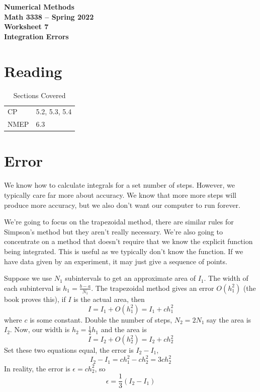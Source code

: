 \documentclass[11pt,letterpaper]{article}
\newcommand{\semester}{Spring 2022}
\begin{document}
\begin{center}
{\huge{\bf  Numerical Methods}} \\[1.5ex]
{\bf Math 3338 -- \semester}\\[1.5ex]
{\Large{\bf Worksheet 7\ \\[2ex] Integration Errors}}\\
\end{center}
\vspace{2mm}

\section{Reading}

\begin{table}[!ht]
 \centering
 \begin{tabular}{ll}
   CP & 5.2, 5.3, 5.4 \\
 NMEP & 6.3
 \end{tabular}
\caption{Sections Covered}
\end{table}



\section{Error}
We know how to calculate integrals for a set number of steps. However, we typically care far 
more about accuracy. We know that more more steps will produce more accuracy, but we also
don't want our computer to run forever. 

We're going to focus on the trapezoidal method, there are similar rules for Simpson's method but 
they aren't really necessary. We're also going to concentrate on a method that doesn't require
that we know the explicit function being integrated. This is useful as we typically don't know
the function. If we have data given by an experiment, it may just give a sequence of points.


Suppose we use $N_1$ subintervals to get an approximate area of $I_1$. The width of each 
subinterval is $h_1=\frac{b-a}{N_1}$. The trapezoidal method gives an error $O(h_1^2)$ (the book
proves this), if $I$ is the actual area, then
\[
I = I_1+O(h_1^2) = I_1+ch_1^2
\]
where $c$ is some constant. Double the number of steps, $N_2=2N_1$ say the area is $I_2$. Now,
our width is $h_2=\frac{1}{2}h_1$ and the area is
\[
 I = I_2+O(h_2^2) = I_2+ch_2^2
\]
Set these two equations equal, the error is $I_2-I_1$,
\[
I_2-I_1 = ch_1^2-ch_2^2 = 3ch_2^2
\]
In reality, the error is $\epsilon = ch_2^2$, so
\[
\epsilon = \frac{1}{3}(I_2-I_1)
\]
\end{document}
